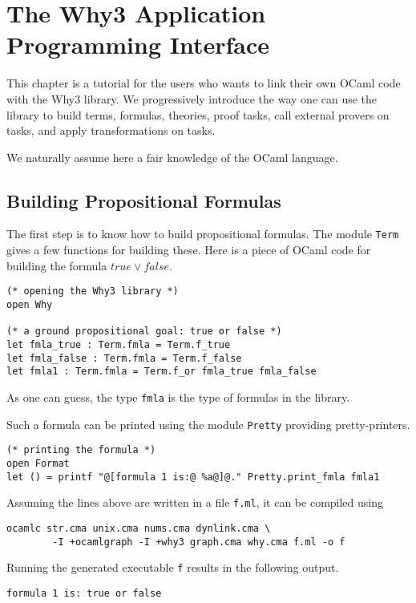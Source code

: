 \chapter{The Why3 Application Programming Interface}
\label{chap:api}

This chapter is a tutorial for the users who wants to link their own
OCaml code with the Why3 library. We progressively introduce the way
one can use the library to build terms, formulas, theories, proof
tasks, call external provers on tasks, and apply transformations on
tasks.

We naturally assume here a fair knowledge of the OCaml language.

\section{Building Propositional Formulas}

The first step is to know how to build propositional formulas. The
module \texttt{Term} gives a few functions for building these. Here is
a piece of OCaml code for building the formula $true \lor false$.
\begin{verbatim}
(* opening the Why3 library *)
open Why

(* a ground propositional goal: true or false *)
let fmla_true : Term.fmla = Term.f_true
let fmla_false : Term.fmla = Term.f_false
let fmla1 : Term.fmla = Term.f_or fmla_true fmla_false
\end{verbatim}
As one can guess, the type \texttt{fmla} is the type of formulas in
the library.

Such a formula can be printed using the module \texttt{Pretty}
providing pretty-printers.
\begin{verbatim}
(* printing the formula *)
open Format
let () = printf "@[formula 1 is:@ %a@]@." Pretty.print_fmla fmla1
\end{verbatim}

Assuming the lines above are written in a file \texttt{f.ml}, it can
be compiled using
\begin{verbatim}
ocamlc str.cma unix.cma nums.cma dynlink.cma \
        -I +ocamlgraph -I +why3 graph.cma why.cma f.ml -o f
\end{verbatim}
Running the generated executable \texttt{f} results in the following output.
\begin{verbatim}
formula 1 is: true or false
\end{verbatim}

